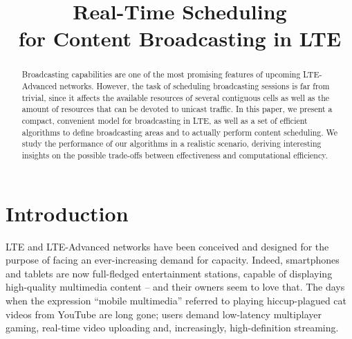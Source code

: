 \documentclass[10pt, conference, compsocconf]{IEEEtran}
\numberwithin{equation}{section}
\begin{document}
\title{Real-Time Scheduling\\
for Content Broadcasting in LTE}

\author{
\and
{}
\and
{}
\and
{}
}

\maketitle
\thispagestyle{empty}
\pagestyle{empty}

\begin{abstract}
Broadcasting capabilities are one of the most promising features of upcoming LTE-Advanced networks.
However, the task of scheduling  broadcasting sessions is far from trivial, since it affects
the available resources of several contiguous cells as well as the
amount of resources that can be devoted to unicast traffic. In this paper, we
present a compact, convenient model for broadcasting in LTE, as well as a set of efficient algorithms
to define broadcasting areas and 
to actually perform content scheduling. 
We study the performance of our algorithms in a realistic scenario, deriving interesting
insights on the possible trade-offs between effectiveness and computational efficiency.
\end{abstract}

\section{Introduction
\label{sec:intro}
}

LTE and LTE-Advanced networks have been conceived and designed for the purpose of facing an ever-increasing
demand for capacity. Indeed, smartphones and tablets are now full-fledged entertainment stations, capable of
displaying high-quality multimedia content -- and their owners seem to love that. The days when the expression
``mobile multimedia'' referred to playing hiccup-plagued cat videos from YouTube are long gone; users demand
low-latency multiplayer gaming, real-time video uploading and, increasingly, high-definition streaming.
\end{document}
